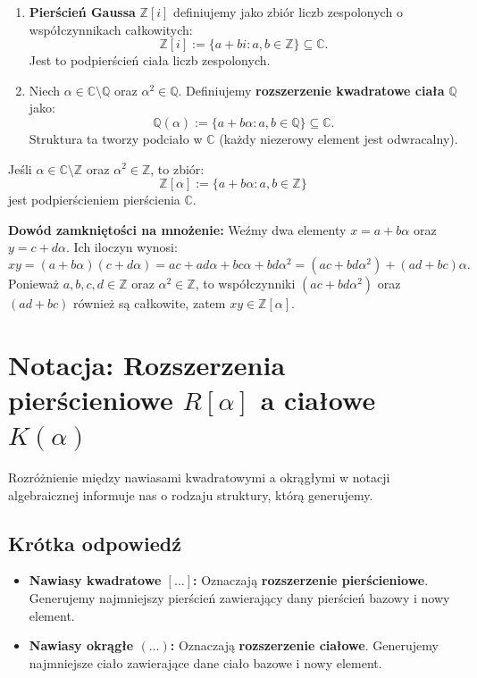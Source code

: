 \begin{definition}
    \begin{enumerate}[label=\arabic*)]
        \item \textbf{Pierścień Gaussa} $\mathbb{Z}[i]$ definiujemy jako zbiór liczb zespolonych o współczynnikach całkowitych:
        \[ \mathbb{Z}[i] := \{a + bi : a, b \in \mathbb{Z}\} \subseteq \mathbb{C}. \]
        Jest to podpierścień ciała liczb zespolonych.
        
        \item Niech $\alpha \in \mathbb{C} \setminus \mathbb{Q}$ oraz $\alpha^2 \in \mathbb{Q}$. Definiujemy \textbf{rozszerzenie kwadratowe ciała} $\mathbb{Q}$ jako:
        \[ \mathbb{Q}(\alpha) := \{a + b\alpha : a, b \in \mathbb{Q}\} \subseteq \mathbb{C}. \]
        Struktura ta tworzy podciało w $\mathbb{C}$ (każdy niezerowy element jest odwracalny).
    \end{enumerate}
\end{definition}

\begin{remark}
    Jeśli $\alpha \in \mathbb{C} \setminus \mathbb{Z}$ oraz $\alpha^2 \in \mathbb{Z}$, to zbiór:
    \[ \mathbb{Z}[\alpha] := \{a + b\alpha : a, b \in \mathbb{Z}\} \]
    jest podpierścieniem pierścienia $\mathbb{C}$. 
    
    \textbf{Dowód zamkniętości na mnożenie:}
    Weźmy dwa elementy $x = a + b\alpha$ oraz $y = c + d\alpha$. Ich iloczyn wynosi:
    \[ xy = (a + b\alpha)(c + d\alpha) = ac + ad\alpha + bc\alpha + bd\alpha^2 = (ac + bd\alpha^2) + (ad + bc)\alpha. \]
    Ponieważ $a, b, c, d \in \mathbb{Z}$ oraz $\alpha^2 \in \mathbb{Z}$, to współczynniki $(ac + bd\alpha^2)$ oraz $(ad + bc)$ również są całkowite, zatem $xy \in \mathbb{Z}[\alpha]$.
\end{remark}
\section*{Notacja: Rozszerzenia pierścieniowe $R[\alpha]$ a ciałowe $K(\alpha)$}

Rozróżnienie między nawiasami kwadratowymi a okrągłymi w notacji algebraicznej informuje nas o rodzaju struktury, którą generujemy.

\subsection*{Krótka odpowiedź}
\begin{itemize}
    \item \textbf{Nawiasy kwadratowe $[\dots]$:} Oznaczają \textbf{rozszerzenie pierścieniowe}. Generujemy najmniejszy pierścień zawierający dany pierścień bazowy i nowy element.
    \item \textbf{Nawiasy okrągłe $(\dots)$:} Oznaczają \textbf{rozszerzenie ciałowe}. Generujemy najmniejsze ciało zawierające dane ciało bazowe i nowy element.
\end{itemize}

